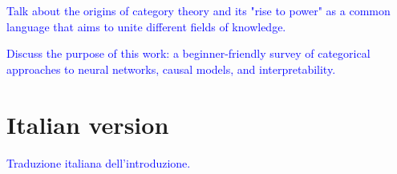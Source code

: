 \documentclass[11pt,a4paper,openright,twoside]{report}
\theoremstyle{plain}
\theoremstyle{definition}
\begin{document}
  \textcolor{blue}{Talk about the origins of category theory and its "rise to power" as a common language that aims to unite different fields of knowledge.}
    
  \textcolor{blue}{Discuss the purpose of this work: a beginner-friendly survey of categorical approaches to neural networks, causal models, and interpretability.}


  \section*{Italian version}

  \textcolor{blue}{Traduzione italiana dell'introduzione.}


\clearpage{\pagestyle{empty}\cleardoublepage}





















































\end{document}
